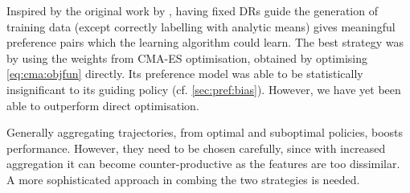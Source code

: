 Inspired by the original work by \cite{Siggi05}, having fixed DRs guide the 
generation of training data (except correctly labelling with analytic means) 
gives meaningful preference pairs which the learning algorithm could learn. 
The best strategy was by using the weights from CMA-ES optimisation, obtained 
by optimising \cref{eq:cma:objfun} directly. 
Its preference model was able to be statistically insignificant to its guiding 
policy (cf. \cref{sec:pref:bias}). 
However, we have yet been able to outperform direct optimisation. 

Generally aggregating trajectories, from optimal and suboptimal policies, 
boosts performance. However, they need to be chosen carefully, since
with increased aggregation it can become counter-productive as the features are 
too dissimilar. 
A more sophisticated approach in combing the two strategies is needed. 

